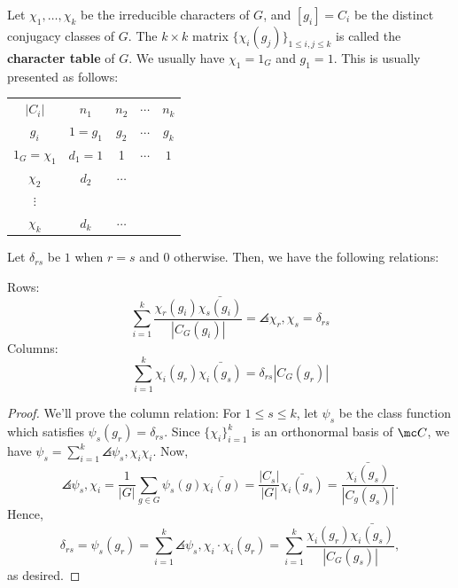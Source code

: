 \begin{defn}
    Let $\chi_1,\dots,\chi_k$ be the irreducible characters of $G$, and $[g_i]=C_i$ be the distinct conjugacy classes of $G$. The $k \times k$ matrix $\{\chi_i(g_j)\}_{1 \leq i,j \leq k}$ is called the \textbf{character table} of $G$. We usually have $\chi_1 = 1_G$ and $g_1=1$. This is usually presented as follows:

    \centering
    \begin{tabular}{c|cccc}
            $|C_i|$ & $n_1$ & $n_2$ & $\cdots$ & $n_k$ \\
            $g_i$ & $1=g_1$ & $g_2$ & $\cdots$ & $g_k$ \\ \hline
            $1_G=\chi _1$ & $d_1=1$ & 1 & $\cdots$ & $1$ \\
            $\chi_2$ & $d_2$ & $\cdots$ &  & \\ $\vdots$ \\
            $\chi _k$ & $d_k$ & $\cdots$ &  & \\
        \end{tabular}
\end{defn}

\begin{thm}
    Let $\delta_{rs}$ be $1$ when $r=s$ and $0$ otherwise. Then, we have the following relations:

    Rows:
    $$\sum_{i=1}^k \frac{\chi_r(g_i) \bar{\chi_s(g_i)}}{|C_G(g_i)|}=\angles{\chi_r,\chi _s}=\delta_{rs}$$
    Columns:
    $$\sum_{i=1}^k\chi _i(g_r) \bar{\chi_i(g_s)}=\delta_{rs}|C_G(g_r)|$$
\end{thm}

\begin{proof}
    We'll prove the column relation: For $1 \leq s \leq k$, let $\psi _s$ be the class function which satisfies
    $\psi_s(g_r) = \delta _{rs}$. Since $\{\chi_i\}_{i=1}^k$ is an orthonormal basis of $\mc C$, we have $\psi _s = \sum_{i=1}^k\angles{\psi _s,\chi _i}\chi _i$. Now,
    $$\angles{\psi_s,\chi_i}=\frac{1}{|G|}\sum_{g \in G}\psi_s(g) \bar{\chi_i(g)} = \frac{|C_s|}{|G|}\bar{\chi_i(g_s)}=\frac{\bar{\chi_i(g_s)}}{|C_g(g_s)|}.$$
    Hence,
    $$\delta_{rs}=\psi_s(g_r)=\sum_{i=1}^k\angles{\psi _s,\chi _i}\cdot \chi_i(g_r) = \sum_{i=1}^k\frac{\chi_i(g_r) \bar{\chi_i(g_s)}}{|C_G(g_s)|},$$
    as desired.
\end{proof}

